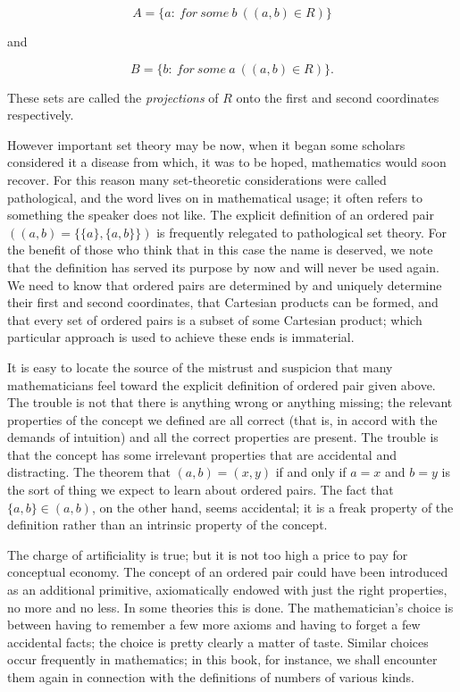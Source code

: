 \begin{equation*}
A = \{ a : \: for \: some \: b\ ((a,b) \in R) \}
\end{equation*}

and 

\begin{equation*}
B = \{ b : \: for \: some \: a\ ((a,b) \in R) \}.
\end{equation*}

These sets are called the \textit{projections} of $R$ onto the first and second coordinates respectively.

However important set theory may be now, when it began some scholars considered it a disease from which, it was to be hoped, mathematics would soon recover. For this reason many set-theoretic considerations were called pathological, and the word lives on in mathematical usage; it often refers to something the speaker does not like. The explicit definition of an ordered pair $((a,b) = \{ \{ a \}, \{ a, b \} \})$ is frequently relegated to pathological set theory. For the benefit of those who think that in this case the name is deserved, we note that the definition has served its purpose by now and will never be used again. We need to know that ordered pairs are determined by and uniquely determine their first and second coordinates, that Cartesian products can be formed, and that every set of ordered pairs is a subset of some Cartesian product; which particular approach is used to achieve these ends is immaterial. 

It is easy to locate the source of the mistrust and suspicion that many mathematicians feel toward the explicit definition of ordered pair given above. The trouble is not that there is anything wrong or anything missing; the relevant properties of the concept we defined are all correct (that is, in accord with the demands of intuition) and all the correct properties are present. The trouble is that the concept has some irrelevant properties that are accidental and  distracting. The theorem that $(a, b) = (x, y)$ if and only if $a = x$ and $b = y$ is the sort of thing we expect to learn about ordered pairs. The fact that $\{ a, b \} \in (a,b) $, on the other hand, seems accidental; it is a freak property of the definition rather than an intrinsic property of the concept.

The charge of artificiality is true; but it is not too high a price to pay for conceptual economy. The concept of an ordered pair could have been introduced as an additional primitive, axiomatically endowed with just the right properties, no more and no less. In some theories this is done. The mathematician's choice is between having to remember a few more axioms and having to forget a few accidental facts; the choice is pretty clearly a matter of taste. Similar choices occur frequently in mathematics; in this book, for instance, we shall encounter them again in connection with the definitions of numbers of various kinds. 

